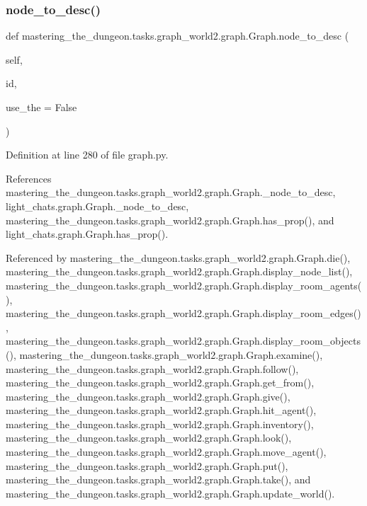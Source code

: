 \subsubsection{\texorpdfstring{node\+\_\+to\+\_\+desc()}{node\_to\_desc()}}
{\footnotesize\ttfamily def mastering\+\_\+the\+\_\+dungeon.\+tasks.\+graph\+\_\+world2.\+graph.\+Graph.\+node\+\_\+to\+\_\+desc (\begin{DoxyParamCaption}\item[{}]{self,  }\item[{}]{id,  }\item[{}]{use\+\_\+the = {\ttfamily False} }\end{DoxyParamCaption})}



Definition at line 280 of file graph.\+py.



References mastering\+\_\+the\+\_\+dungeon.\+tasks.\+graph\+\_\+world2.\+graph.\+Graph.\+\_\+node\+\_\+to\+\_\+desc, light\+\_\+chats.\+graph.\+Graph.\+\_\+node\+\_\+to\+\_\+desc, mastering\+\_\+the\+\_\+dungeon.\+tasks.\+graph\+\_\+world2.\+graph.\+Graph.\+has\+\_\+prop(), and light\+\_\+chats.\+graph.\+Graph.\+has\+\_\+prop().



Referenced by mastering\+\_\+the\+\_\+dungeon.\+tasks.\+graph\+\_\+world2.\+graph.\+Graph.\+die(), mastering\+\_\+the\+\_\+dungeon.\+tasks.\+graph\+\_\+world2.\+graph.\+Graph.\+display\+\_\+node\+\_\+list(), mastering\+\_\+the\+\_\+dungeon.\+tasks.\+graph\+\_\+world2.\+graph.\+Graph.\+display\+\_\+room\+\_\+agents(), mastering\+\_\+the\+\_\+dungeon.\+tasks.\+graph\+\_\+world2.\+graph.\+Graph.\+display\+\_\+room\+\_\+edges(), mastering\+\_\+the\+\_\+dungeon.\+tasks.\+graph\+\_\+world2.\+graph.\+Graph.\+display\+\_\+room\+\_\+objects(), mastering\+\_\+the\+\_\+dungeon.\+tasks.\+graph\+\_\+world2.\+graph.\+Graph.\+examine(), mastering\+\_\+the\+\_\+dungeon.\+tasks.\+graph\+\_\+world2.\+graph.\+Graph.\+follow(), mastering\+\_\+the\+\_\+dungeon.\+tasks.\+graph\+\_\+world2.\+graph.\+Graph.\+get\+\_\+from(), mastering\+\_\+the\+\_\+dungeon.\+tasks.\+graph\+\_\+world2.\+graph.\+Graph.\+give(), mastering\+\_\+the\+\_\+dungeon.\+tasks.\+graph\+\_\+world2.\+graph.\+Graph.\+hit\+\_\+agent(), mastering\+\_\+the\+\_\+dungeon.\+tasks.\+graph\+\_\+world2.\+graph.\+Graph.\+inventory(), mastering\+\_\+the\+\_\+dungeon.\+tasks.\+graph\+\_\+world2.\+graph.\+Graph.\+look(), mastering\+\_\+the\+\_\+dungeon.\+tasks.\+graph\+\_\+world2.\+graph.\+Graph.\+move\+\_\+agent(), mastering\+\_\+the\+\_\+dungeon.\+tasks.\+graph\+\_\+world2.\+graph.\+Graph.\+put(), mastering\+\_\+the\+\_\+dungeon.\+tasks.\+graph\+\_\+world2.\+graph.\+Graph.\+take(), and mastering\+\_\+the\+\_\+dungeon.\+tasks.\+graph\+\_\+world2.\+graph.\+Graph.\+update\+\_\+world().

